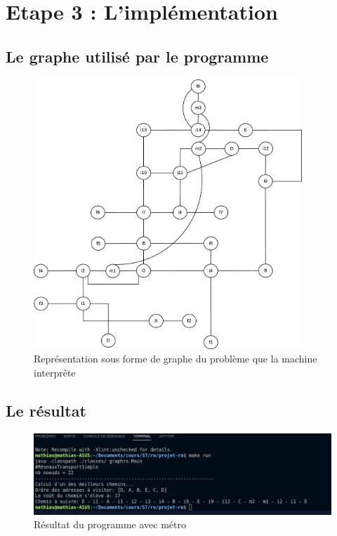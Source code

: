       \newpage


\section{Etape 3 : L'implémentation}

  \subsection{Le graphe utilisé par le programme}

    \begin{figure}[h!]
            \centering
                \includegraphics[width=0.9\textwidth]{images/grapheProgramme.eps}
            \caption{Représentation sous forme de graphe du problème que la machine interprête}
            \label{fig:graphe} %
    \end{figure}

    \pagebreak


  \subsection{Le résultat}

    \begin{figure}[h!]
            \centering
                \includegraphics[width=1\textwidth]{images/resultatAvecMetro.png}
            \caption{Résultat du programme avec métro}
            \label{fig:graphe} %
    \end{figure}


